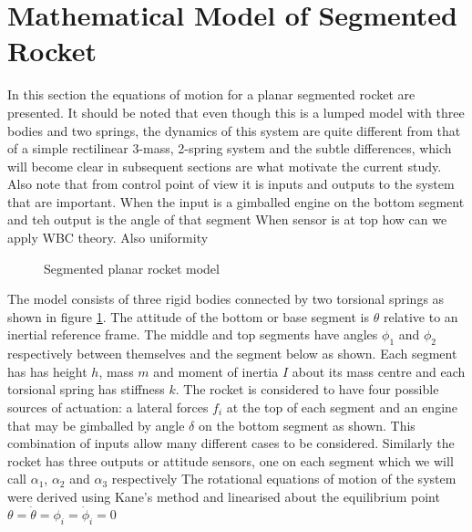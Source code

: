 \documentclass{mbd_fullpaper}
\begin{document}
\section{Mathematical Model of Segmented Rocket}
In this section the equations of motion for a planar segmented rocket are presented.
It should be noted that even though this is a lumped model with three bodies and two springs, the dynamics of this system are quite different from that of a simple rectilinear 3-mass, 2-spring system and the subtle differences, which will become clear in subsequent sections are what motivate the current study.
Also note that from control point of view it is inputs and outputs to the system that are important.
When the input is a gimballed engine on the bottom segment and teh output is the angle of that segment
When sensor is at top how can we apply WBC theory.
Also uniformity

\begin{figure}[h]
  \begin{center}
    
    \caption{Segmented planar rocket model \label{fig:rocket-model}}
  \end{center}
\end{figure}
The model consists of three rigid bodies connected by two torsional springs as shown in figure \ref{fig:rocket-model}.
The attitude of the bottom or base segment is $\theta$ relative to an inertial reference frame.
The middle and top segments have angles $\phi_1$ and $\phi_2$ respectively between themselves and the segment below as shown.
Each segment has has height $h$, mass $m$ and moment of inertia $I$ about its mass centre and each torsional spring has stiffness $k$.
The rocket is considered to have four possible sources of actuation: a lateral forces $f_i$ at the top of each segment and an engine that may be gimballed by angle $\delta$ on the bottom segment as shown.
This combination of inputs allow many different cases to be considered.
Similarly the rocket has three outputs or attitude sensors, one on each segment which we will call $\alpha_1$, $\alpha_2$ and $\alpha_3$ respectively
The rotational equations of motion of the system were derived using Kane's method \cite{Kane1980} and linearised about the equilibrium point $\theta=\dot{\theta}=\phi_i=\dot{\phi}_i=0$
\begin{multline}

\end{multline}
\begin{equation}

\end{equation}
\end{document}
